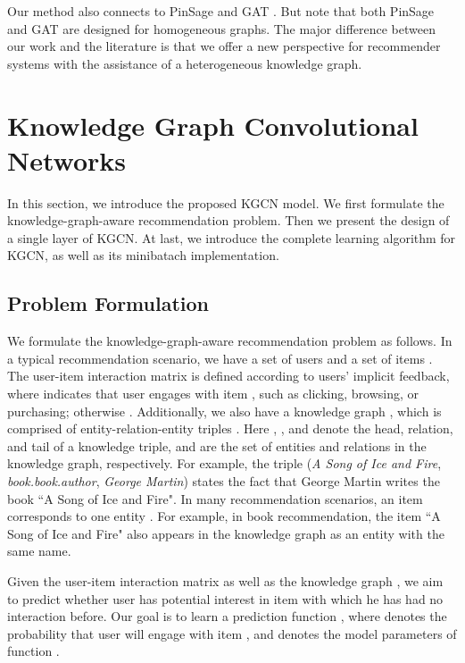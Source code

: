 \documentclass[sigconf]{acmart}
\begin{document}
	Our method also connects to PinSage \cite{ying2018graph} and GAT \cite{velickovic2017graph}.
	But note that both PinSage and GAT are designed for homogeneous graphs.
	The major difference between our work and the literature is that we offer a new perspective for recommender systems with the assistance of a heterogeneous knowledge graph.
	
	
	
\section{Knowledge Graph Convolutional Networks}
	In this section, we introduce the proposed KGCN model.
	We first formulate the knowledge-graph-aware recommendation problem.
	Then we present the design of a single layer of KGCN.
	At last, we introduce the complete learning algorithm for KGCN, as well as its minibatach implementation.
	
	\subsection{Problem Formulation}
		We formulate the knowledge-graph-aware recommendation problem as follows.
		In a typical recommendation scenario, we have a set of  users  and a set of  items .
		The user-item interaction matrix  is defined according to users' implicit feedback, where  indicates that user  engages with item , such as  clicking, browsing, or purchasing; otherwise .
		Additionally, we also have a knowledge graph , which is comprised of entity-relation-entity triples .
		Here , , and  denote the head, relation, and tail of a knowledge triple,  and  are the set of entities and relations in the knowledge graph, respectively.
		For example, the triple (\textit{A Song of Ice and Fire}, \textit{book.book.author}, \textit{George Martin}) states the fact that George Martin writes the book ``A Song of Ice and Fire".
		In many recommendation scenarios, an item  corresponds to one entity .
		For example, in book recommendation, the item ``A Song of Ice and Fire" also appears in the knowledge graph as an entity with the same name.


		Given the user-item interaction matrix  as well as the knowledge graph , we aim to predict whether user  has potential interest in item  with which he has had no interaction before.
		Our goal is to learn a prediction function , where  denotes the probability that user  will engage with item , and  denotes the model parameters of function .
	
\end{document}
